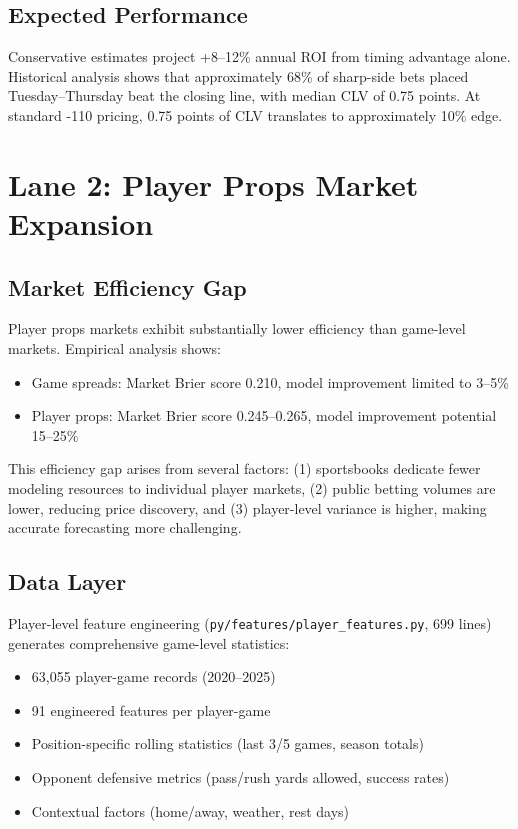\subsection{Expected Performance}

Conservative estimates project +8--12\% annual ROI from timing advantage alone. Historical analysis shows that approximately 68\% of sharp-side bets placed Tuesday--Thursday beat the closing line, with median CLV of 0.75 points. At standard -110 pricing, 0.75 points of CLV translates to approximately 10\% edge.

\section{Lane 2: Player Props Market Expansion}

\subsection{Market Efficiency Gap}

Player props markets exhibit substantially lower efficiency than game-level markets. Empirical analysis shows:
\begin{itemize}
  \item Game spreads: Market Brier score 0.210, model improvement limited to 3--5\%
  \item Player props: Market Brier score 0.245--0.265, model improvement potential 15--25\%
\end{itemize}

This efficiency gap arises from several factors: (1) sportsbooks dedicate fewer modeling resources to individual player markets, (2) public betting volumes are lower, reducing price discovery, and (3) player-level variance is higher, making accurate forecasting more challenging.

\subsection{Data Layer}

Player-level feature engineering (\texttt{py/features/player\_features.py}, 699 lines) generates comprehensive game-level statistics:
\begin{itemize}
  \item 63,055 player-game records (2020--2025)
  \item 91 engineered features per player-game
  \item Position-specific rolling statistics (last 3/5 games, season totals)
  \item Opponent defensive metrics (pass/rush yards allowed, success rates)
  \item Contextual factors (home/away, weather, rest days)
\end{itemize}

